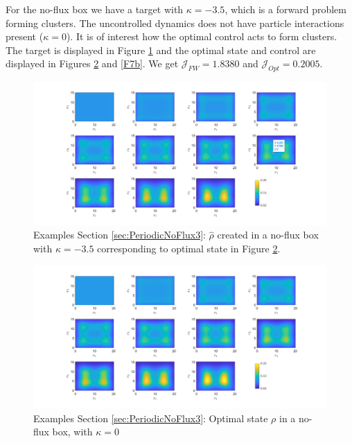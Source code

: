 \documentclass[11pt, a4paper]{article}
\theoremstyle{definition}
\newcommand{\hr}{\widehat \rho}
\begin{document}
For the no-flux box we have a target with $\kappa = -3.5$, which is a forward problem forming clusters. The uncontrolled dynamics does not have particle interactions present ($\kappa =0$). It is of interest how the optimal control acts to form clusters. The target is displayed in Figure \ref{F7} and the optimal state and control are displayed in Figures \ref{F7a} and \ref{F7b}. We get $\mathcal J_{FW} = 1.8380$ and $\mathcal J_{Opt} = 0.2005$.
\begin{figure}[h]
	\centering
	\includegraphics[scale=0.35]{rhoHatPeri7.png}
	\caption{Examples Section \ref{sec:PeriodicNoFlux3}: $\hr$ created in a no-flux box with $\kappa = -3.5$ corresponding to optimal state in Figure \ref{F7a}.} 
	\label{F7}
\end{figure}
\begin{figure}[h]
	\centering
	\includegraphics[scale=0.35]{rhoOptPeri7.png}
	\caption{Examples Section \ref{sec:PeriodicNoFlux3}: Optimal state $\rho$ in a no-flux box, with $\kappa = 0$} 
	\label{F7a}
\end{figure}
\end{document}
